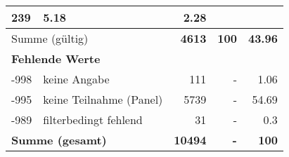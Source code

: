 \begin{longtable}{lXrrr}
       \num{239} &
       \num[round-mode=places,round-precision=2]{5.18} &
         \num[round-mode=places,round-precision=2]{2.28} \\
     \midrule
     \multicolumn{2}{l}{Summe (gültig)} &
       \textbf{\num{4613}} &
     \textbf{\num{100}} &
       \textbf{\num[round-mode=places,round-precision=2]{43.96}} \\
     \multicolumn{5}{l}{\textbf{Fehlende Werte}}\\
       -998 &
       keine Angabe &
         \num{111} &
        - &
         \num[round-mode=places,round-precision=2]{1.06} \\
       -995 &
       keine Teilnahme (Panel) &
         \num{5739} &
        - &
         \num[round-mode=places,round-precision=2]{54.69} \\
       -989 &
       filterbedingt fehlend &
         \num{31} &
        - &
         \num[round-mode=places,round-precision=2]{0.3} \\
     \midrule
     \multicolumn{2}{l}{\textbf{Summe (gesamt)}} &
          \textbf{\num{10494}} &
        \textbf{-} &
        \textbf{\num{100}} \\
     \bottomrule
     \end{longtable}
     
